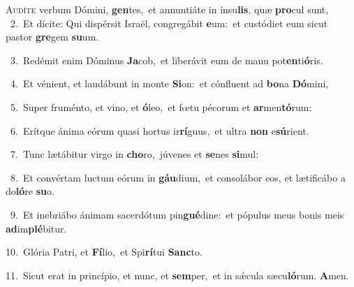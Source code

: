 \lettrine{\initial\textcolor{\initialcolor}{A}}{udíte} verbum Dómini, \textbf{gen}\-tes,~\star et annuntiáte in ínsu\-\textbf{lis}\-, quæ \textbf{pro}\-cul sunt,\\
{\numbfont\textcolor{\numbcolor}{~2.}}~Et dícite: Qui dispérsit Israël, congregábit \textbf{e}\-um:~\star et custódiet eum sicut pastor \textbf{gre}\-gem \textbf{su}\-um.\par
{\numbfont\textcolor{\numbcolor}{~3.}}~Redémit enim Dóminus \textbf{Ja}\-cob,~\star et liberávit eum de manu pot\-\textbf{en}\-ti\-\textbf{ó}\-ris.\par
{\numbfont\textcolor{\numbcolor}{~4.}}~Et vénient, et laudábunt in monte \textbf{Si}\-on:~\star et cónfluent ad \textbf{bo}\-na \textbf{Dó}\-mini,\par
{\numbfont\textcolor{\numbcolor}{~5.}}~Super fruménto, et vino, et \textbf{ó}\-leo,~\star et fœtu pécorum et \textbf{ar}\-men\-\textbf{tó}\-rum:\par
{\numbfont\textcolor{\numbcolor}{~6.}}~Erítque ánima eórum quasi hortus ir\-\textbf{rí}\-guus,~\star et ultra \textbf{non} e\-\textbf{sú}\-rient.\par
{\numbfont\textcolor{\numbcolor}{~7.}}~Tunc lætábitur virgo in \textbf{cho}\-ro,~\star júvenes et \textbf{se}\-nes \textbf{si}\-mul:\par
{\numbfont\textcolor{\numbcolor}{~8.}}~Et convértam luctum eórum in \textbf{gáu}\-dium,~\star et consolábor eos, et lætificábo a do\-\textbf{ló}\-re \textbf{su}\-o.\par
{\numbfont\textcolor{\numbcolor}{~9.}}~Et inebriábo ánimam sacerdótum pin\-\textbf{gué}\-dine:~\star et pópulus meus bonis meis \textbf{ad}\-im\-\textbf{plé}\-bitur.\par
{\numbfont\textcolor{\numbcolor}{10.}}~Glória Patri, et \textbf{Fí}\-lio,~\star et Spi\-\textbf{rí}\-tui \textbf{Sanc}\-to.\par
{\numbfont\textcolor{\numbcolor}{11.}}~Sicut erat in princípio, et nunc, et \textbf{sem}\-per,~\star et in sǽcula sæcu\-\textbf{ló}\-rum. \textbf{A}\-men.\par
